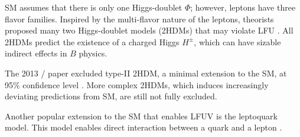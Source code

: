 SM assumes that there is only one Higgs-doublet $\Phi$; however, leptons have
three flavor families.
Inspired by the multi-flavor nature of the leptons, theorists proposed many two
Higgs-doublet models (2HDMs) that may violate LFU \cite{Branco:2011iw}.
All 2HDMs predict the existence of a charged Higgs $H^{\pm}$, which can have
sizable indirect effects in $B$ physics.

The 2013 \BaBar/ paper excluded type-II 2HDM, a minimal extension to the SM, at
95\% confidence level \cite{Lees:2013uzd}.
More complex 2HDMs, which induces increasingly deviating predictions from SM, are
still not fully excluded.

Another popular extension to the SM that enables LFUV is the leptoquark model.
This model enables direct interaction between a quark and a lepton \cite{Faber:2018afz}.